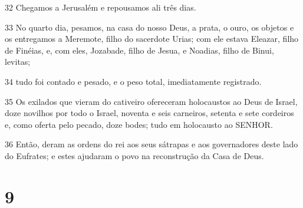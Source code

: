 \par 32 Chegamos a Jerusalém e repousamos ali três dias.
\par 33 No quarto dia, pesamos, na casa do nosso Deus, a prata, o ouro, os objetos e os entregamos a Meremote, filho do sacerdote Urias; com ele estava Eleazar, filho de Finéias, e, com eles, Jozabade, filho de Jesua, e Noadias, filho de Binui, levitas;
\par 34 tudo foi contado e pesado, e o peso total, imediatamente registrado.
\par 35 Os exilados que vieram do cativeiro ofereceram holocaustos ao Deus de Israel, doze novilhos por todo o Israel, noventa e seis carneiros, setenta e sete cordeiros e, como oferta pelo pecado, doze bodes; tudo em holocausto ao SENHOR.
\par 36 Então, deram as ordens do rei aos seus sátrapas e aos governadores deste lado do Eufrates; e estes ajudaram o povo na reconstrução da Casa de Deus.

\chapter{9}

